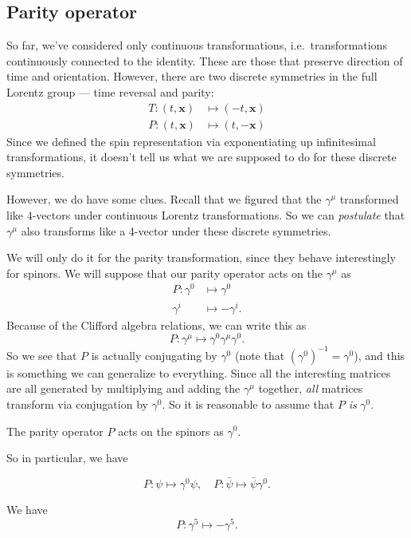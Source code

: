 \documentclass[a4paper]{article}
\begin{document}
\subsection{Parity operator}
So far, we've considered only continuous transformations, i.e.\ transformations continuously connected to the identity. These are those that preserve direction of time and orientation. However, there are two discrete symmetries in the full Lorentz group --- time reversal and parity:
\begin{align*}
  T: (t, \mathbf{x}) &\mapsto (-t, \mathbf{x})\\
  P: (t, \mathbf{x}) &\mapsto (t, -\mathbf{x})
\end{align*}
Since we defined the spin representation via exponentiating up infinitesimal transformations, it doesn't tell us what we are supposed to do for these discrete symmetries.

However, we do have some clues. Recall that we figured that the $\gamma^\mu$ transformed like $4$-vectors under continuous Lorentz transformations. So we can \emph{postulate} that $\gamma^\mu$ also transforms like a 4-vector under these discrete symmetries.

We will only do it for the parity transformation, since they behave interestingly for spinors. We will suppose that our parity operator acts on the $\gamma^\mu$ as
\begin{align*}
  P: \gamma^0 &\mapsto \gamma^0\\
     \gamma^i &\mapsto -\gamma^i.
\end{align*}
Because of the Clifford algebra relations, we can write this as
\[
  P: \gamma^\mu \mapsto \gamma^0 \gamma^\mu \gamma^0.
\]
So we see that $P$ is actually conjugating by $\gamma^0$ (note that $(\gamma^0)^{-1} = \gamma^0$), and this is something we can generalize to everything. Since all the interesting matrices are all generated by multiplying and adding the $\gamma^\mu$ together, \emph{all} matrices transform via conjugation by $\gamma^0$. So it is reasonable to assume that $P$ \emph{is} $\gamma^0$.
\begin{axiom}
  The parity operator $P$ acts on the spinors as $\gamma^0$.
\end{axiom}

So in particular, we have
\begin{prop}
  \[
    P : \psi \mapsto \gamma^0 \psi,\quad P: \bar\psi \mapsto \bar\psi \gamma^0.
  \]
\end{prop}

\begin{prop}
  We have
  \[
    P:\gamma^5 \mapsto - \gamma^5.
  \]
\end{prop}
\end{document}
